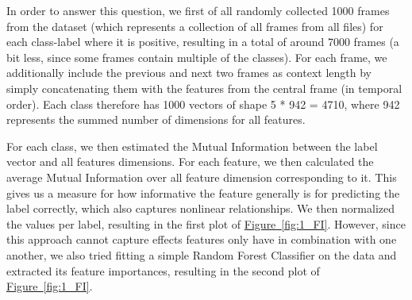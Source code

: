 In order to answer this question, we first of all randomly collected 1000 frames from the dataset (which represents a collection of all frames from all files) for each class-label where it is positive, resulting in a total of around 7000 frames (a bit less, since some frames contain multiple of the classes). For each frame, we additionally include the previous and next two frames as context length by simply concatenating them with the features from the central frame (in temporal order). Each class therefore has 1000 vectors of shape 5 * 942 = 4710, where 942 represents the summed number of dimensions for all features.

For each class, we then estimated the Mutual Information between the label vector and all features dimensions. For each feature, we then calculated the average Mutual Information over all feature dimension corresponding to it. This gives us a measure for how informative the feature generally is for predicting the label correctly, which also captures nonlinear relationships. We then normalized the values per label, resulting in the first plot of \hyperref[fig:1_FI]{Figure~\ref*{fig:1_FI}}. However, since this approach cannot capture effects features only have in combination with one another, we also tried fitting a simple Random Forest Classifier on the data and extracted its feature importances, resulting in the second plot of \hyperref[fig:1_FI]{Figure~\ref*{fig:1_FI}}.

